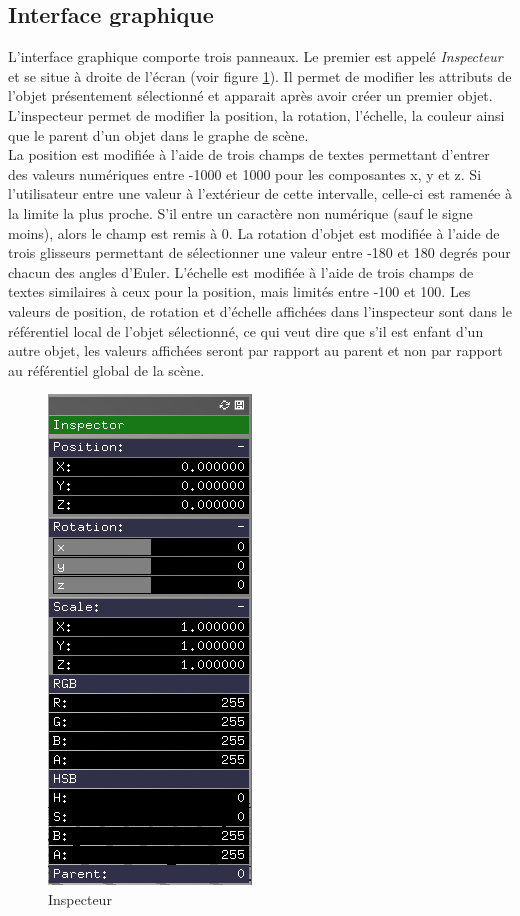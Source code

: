 \subsection{Interface graphique}
L'interface graphique comporte trois panneaux.
Le premier est appelé \emph{Inspecteur} et se situe à droite de l'écran (voir figure \ref{fig:inspecteur}).
Il permet de modifier les attributs de l'objet présentement sélectionné et apparait après avoir créer un premier objet.
L'inspecteur permet de modifier la position, la rotation, l'échelle, la couleur ainsi que le parent d'un objet dans le graphe de scène.\\

La position est modifiée à l'aide de trois champs de textes permettant d'entrer des valeurs numériques entre -1000 et 1000 pour les composantes x, y et z.
Si l'utilisateur entre une valeur à l'extérieur de cette intervalle, celle-ci est ramenée à la limite la plus proche.
S'il entre un caractère non numérique (sauf le signe moins), alors le champ est remis à 0.
La rotation d'objet est modifiée à l'aide de trois glisseurs permettant de sélectionner une valeur entre -180 et 180 degrés pour chacun des angles d'Euler.
L'échelle est modifiée à l'aide de trois champs de textes similaires à ceux pour la position, mais limités entre -100 et 100. Les valeurs de position, de rotation et d'échelle affichées dans l'inspecteur sont dans le référentiel local de l'objet sélectionné, ce qui veut dire que s'il est enfant d'un autre objet, les valeurs affichées seront par rapport au parent et non par rapport au référentiel global de la scène.\\


\begin{figure}
    \centering
	\includegraphics[scale=1]{fig/inspecteur.png}
	\caption{Inspecteur}
	\label{fig:inspecteur}
\end{figure}

